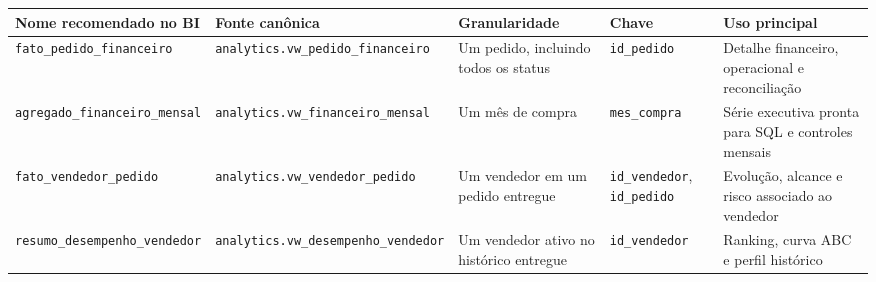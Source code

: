 \documentclass[12pt,a4paper]{article}
\newcounter{none}
\begin{document}
{\def\LTcaptype{none} %
\begin{longtable}[]{@{}
  >{\raggedright\arraybackslash}p{}
  >{\raggedright\arraybackslash}p{}
  >{\raggedright\arraybackslash}p{}
  >{\raggedright\arraybackslash}p{}
  >{\raggedright\arraybackslash}p{}@{}}
\toprule\noalign{}
\rowcolor{AzulCorporativo}
\begin{minipage}[b]{\linewidth}\raggedright\color{white}\bfseries
Nome recomendado no BI
\end{minipage} & \begin{minipage}[b]{\linewidth}\raggedright\color{white}\bfseries
Fonte canônica
\end{minipage} & \begin{minipage}[b]{\linewidth}\raggedright\color{white}\bfseries
Granularidade
\end{minipage} & \begin{minipage}[b]{\linewidth}\raggedright\color{white}\bfseries
Chave
\end{minipage} & \begin{minipage}[b]{\linewidth}\raggedright\color{white}\bfseries
Uso principal
\end{minipage} \\
\midrule\noalign{}
\endhead
\bottomrule\noalign{}
\endlastfoot
\nolinkurl{fato_pedido_financeiro} &
\nolinkurl{analytics.vw_pedido_financeiro} & Um pedido, incluindo todos
os status & \nolinkurl{id_pedido} & Detalhe financeiro, operacional e
reconciliação \\
\nolinkurl{agregado_financeiro_mensal} &
\nolinkurl{analytics.vw_financeiro_mensal} & Um mês de compra &
\nolinkurl{mes_compra} & Série executiva pronta para SQL e controles
mensais \\
\nolinkurl{fato_vendedor_pedido} &
\nolinkurl{analytics.vw_vendedor_pedido} & Um vendedor em um pedido
entregue & \nolinkurl{id_vendedor}, \nolinkurl{id_pedido} & Evolução,
alcance e risco associado ao vendedor \\
\nolinkurl{resumo_desempenho_vendedor} &
\nolinkurl{analytics.vw_desempenho_vendedor} & Um vendedor ativo no
histórico entregue & \nolinkurl{id_vendedor} & Ranking, curva ABC e
perfil histórico \\
\end{longtable}
}
\end{document}
